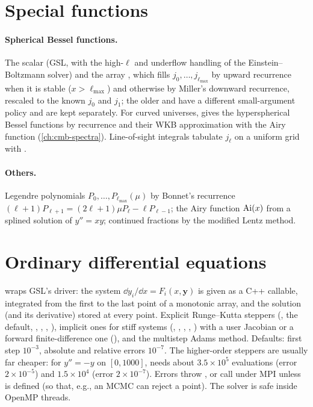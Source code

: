 \section{Special functions}\label{sec:num-special}

\paragraph*{Spherical Bessel functions.} The scalar  (GSL, with the high-$\ell$ and
underflow handling of the Einstein--Boltzmann solver) and the array , which
fills $j_0,\ldots,j_{\ell_{\max}}$ by upward recurrence when it is stable ($x>\ell_{\max}$) and otherwise by Miller's
downward recurrence, rescaled to the known $j_0$ and $j_1$; the older  and  have a different small-argument policy and
are kept separately. For curved universes,  gives the hyperspherical Bessel functions by
recurrence and  their WKB approximation with the Airy function
(\cref{ch:cmb-spectra}). Line-of-sight integrals tabulate $j_\ell$ on a uniform grid with .

\paragraph*{Others.} Legendre polynomials $P_0,\ldots,P_{\ell_{\max}}(\mu)$ by Bonnet's recurrence
$(\ell+1)P_{\ell+1}=(2\ell+1)\mu P_\ell-\ell P_{\ell-1}$; the Airy function ${\rm Ai}(x)$ from a splined solution of $y''=xy$;
continued fractions by the modified Lentz method.

\section{Ordinary differential equations}\label{sec:num-ode}

 wraps GSL's  driver: the system $\dd y_i/\dd x=F_i(x,\bm y)$ is given as a C++ callable,
integrated from the first to the last point of a monotonic array, and the solution (and its derivative) stored at every
point. Explicit Runge--Kutta steppers (, the default, , , , 
\cite{Dormand1980}), implicit ones for stiff systems (, , , ,
) with a user Jacobian or a forward finite-difference one (), and the
multistep Adams method. Defaults: first step $10^{-3}$, absolute and relative errors $10^{-7}$. The higher-order steppers are
usually far cheaper: for $y''=-y$ on $[0,1000]$,  needs about $3.5\times10^5$ evaluations (error $2\times10^{-5}$) and
 $1.5\times10^4$ (error $2\times10^{-7}$). Errors throw , or call  under
MPI unless  is defined (so that, e.g., an MCMC can reject a point). The solver is safe inside
OpenMP threads.

